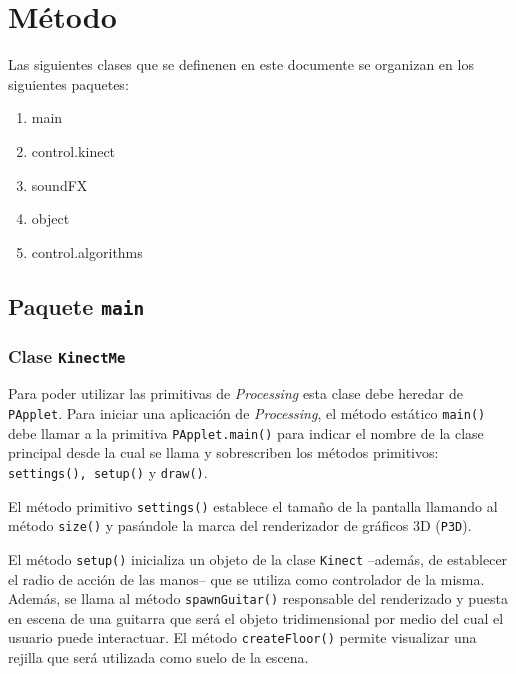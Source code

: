 \documentclass[10pt,a4paper]{report}
\begin{document}
	\section{Método}
	Las siguientes clases que se definenen en este documente se organizan en los siguientes paquetes:
	\begin{enumerate}
		\item main
		\item control.kinect
		\item soundFX
		\item object
		\item control.algorithms
	\end{enumerate}

	\subsection{Paquete \texttt{main}}
	\subsubsection{Clase \texttt{KinectMe}}\label{class:kinectme}
	Para poder utilizar las primitivas de \textit{Processing} esta clase debe heredar de \texttt{PApplet}. Para iniciar una aplicación de \textit{Processing}, el método estático \texttt{main()} debe llamar a la primitiva \texttt{PApplet.main()} para indicar el nombre de la clase principal desde la cual se llama y sobrescriben los métodos primitivos: \texttt{settings(), setup()} y \texttt{draw()}.
	
	
	
	El método primitivo \texttt{settings()} establece el tamaño de la pantalla llamando al método \texttt{size()} y pasándole la marca del renderizador de gráficos 3D (\texttt{P3D}).
	
	
	
	El método \texttt{setup()} inicializa un objeto de la clase \texttt{Kinect} --además, de establecer el radio de acción de las manos-- que se utiliza como controlador de la misma. Además, se llama al método \texttt{spawnGuitar()} responsable del renderizado y puesta en escena de una guitarra que será el objeto tridimensional por medio del cual el usuario puede interactuar. El método \texttt{createFloor()} permite visualizar una rejilla que será utilizada como suelo de la escena.
	
	
	
\end{document}
